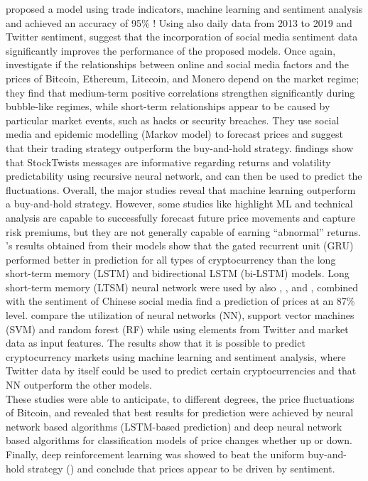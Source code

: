 \documentclass{article}
\begin{document}
	\cite{ppodc} proposed a model using trade indicators, machine learning and sentiment analysis and achieved an accuracy of 95\% ! Using also daily data from 2013 to 2019 and Twitter sentiment, \cite{dlabi} suggest that the incorporation of social media sentiment data significantly improves the performance of the proposed models. Once again, \cite{pcpbu} investigate if the relationships between online and social media factors and the prices of Bitcoin, Ethereum, Litecoin, and Monero depend on the market regime; they find that medium-term positive correlations strengthen significantly during bubble-like regimes, while short-term relationships appear to be caused by particular market events, such as hacks or security breaches. They use social media and epidemic modelling (Markov model) to forecast prices and suggest that their trading strategy outperform the buy-and-hold strategy. \cite{dlbcs} findings show that StockTwists messages are informative regarding returns and volatility predictability using recursive neural network, and can then be used to predict the fluctuations. Overall, the major studies reveal that machine learning outperform a buy-and-hold strategy. However, some studies like \cite{arcot} highlight ML and technical analysis are capable to successfully forecast future price movements and capture risk premiums, but they are not generally capable of earning “abnormal” returns.\\
	
	\cite{ancpp}'s results obtained from their models show that the
	gated recurrent unit (GRU) performed better in prediction for all types of cryptocurrency than the long short-term memory (LSTM) and bidirectional LSTM (bi-LSTM) models. Long short-term memory (LTSM) neural network were used by also \cite{dlbcs}, \cite{dnnfc}, and \cite{lstmb}, combined with the sentiment of Chinese social media find a prediction of prices at an 87\% level. \cite{pmpoc} compare the utilization of neural networks (NN), support vector machines (SVM) and random forest (RF) while using elements from Twitter and market data as input features. The results show that it is possible to predict cryptocurrency markets using machine learning and sentiment analysis, where Twitter data by itself could be used to predict certain cryptocurrencies and that NN outperform the other models.\\
	These studies were able to anticipate, to different degrees, the price fluctuations of Bitcoin, and revealed that best results for prediction were achieved by neural network based algorithms (LSTM-based prediction) and deep neural network based algorithms for classification models of price changes whether up or down. Finally, deep reinforcement learning was showed to beat the uniform buy-and-hold strategy (\cite{ctuml}) and conclude that prices appear to be driven by sentiment. \\
	
\end{document}

